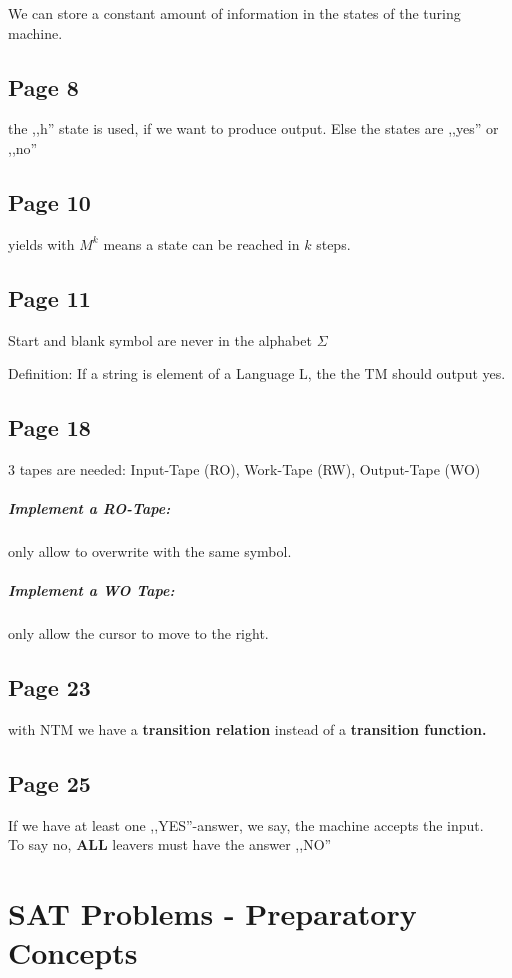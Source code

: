 \documentclass[a4paper]{article}
\begin{document}
We can store a constant amount of information in the states of the turing
machine.


\subsection{Page 8}
the ,,h'' state is used, if we want to produce output. Else the states are
,,yes'' or ,,no''

\subsection{Page 10}

yields with $M^k$ means a state can be reached in $k$ steps.

\subsection{Page 11}
Start and blank symbol are never in the alphabet $\Sigma$

Definition: If a string is element of a Language L, the the TM should output
yes.

\subsection{Page 18}
3 tapes are needed: Input-Tape (RO), Work-Tape (RW), Output-Tape (WO)

\subparagraph{Implement a RO-Tape:} only allow to overwrite with the same
symbol.
\subparagraph{Implement a WO Tape:} only allow the cursor to move to the right.



\subsection{Page 23}

with NTM we have a \textbf{transition relation} instead of a \textbf{transition
function.}

\subsection{Page 25}

If we have at least one ,,YES''-answer, we say, the machine accepts the input.\\
To say no, \textbf{ALL} leavers must have the answer ,,NO''


\section{SAT Problems - Preparatory Concepts}
\end{document}
